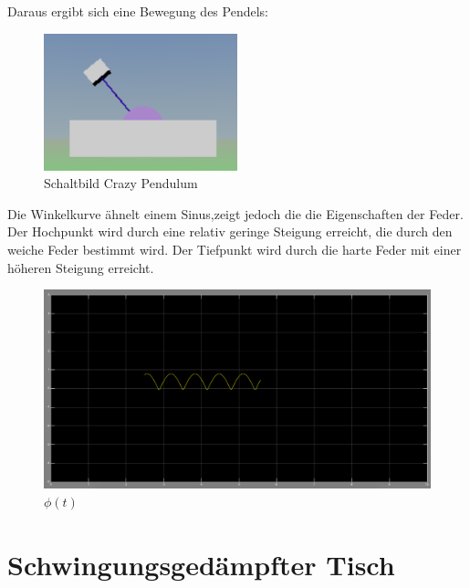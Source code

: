 \documentclass[10pt,a4paper]{article}
\begin{document}
 	Daraus ergibt sich eine Bewegung des Pendels:
 	 	\begin{figure}[H]
 	 		\centering
 	 		\includegraphics[width=0.5\textwidth]{../aufgabe2/pendel.png}
 	 		\caption{Schaltbild Crazy Pendulum}
 	 	\end{figure}
 	Die Winkelkurve ähnelt einem Sinus,zeigt jedoch die die Eigenschaften der Feder. Der Hochpunkt wird durch eine relativ geringe Steigung erreicht, die durch den weiche Feder bestimmt wird. Der Tiefpunkt wird durch die harte Feder mit einer höheren Steigung erreicht. 
 		\begin{figure}[H]
 	 		\centering
 	 		\includegraphics[width=1\textwidth]{../aufgabe2/phit.png}
 	 		\caption{$\phi(t)$}
 	 	\end{figure}

\section{Schwingungsgedämpfter Tisch}
\end{document}
